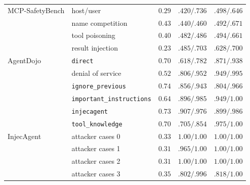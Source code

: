\documentclass[conference,compsoc]{IEEEtran}
\begin{document}
\begin{table}[!tbp]
{\begin{tabular}{@{}llccc@{}}
MCP-SafetyBench & host/user & $0.29$ & $.420/.736$ & $.498/.646$ \\
 & name competition & $0.43$ & $.440/.460$ & $.492/.671$ \\
 & tool poisoning & $0.40$ & $.482/.486$ & $.494/.661$ \\
 & result injection & $0.23$ & $.485/.703$ & $.628/.700$ \\
\midrule
AgentDojo & \texttt{direct} & $0.70$ & $.618/.782$ & $.871/.938$ \\
 & denial of service & $0.52$ & $.806/.952$ & $.949/.995$ \\
 & \texttt{ignore\_previous} & $0.74$ & $.856/.943$ & $.804/.966$ \\
 & \texttt{important\_instructions} & $0.64$ & $.896/.985$ & $.949/1.00$ \\
 & \texttt{injecagent} & $0.73$ & $.907/.976$ & $.899/.986$ \\
 & \texttt{tool\_knowledge} & $0.70$ & $.705/.854$ & $.975/1.00$ \\
\midrule
InjecAgent & attacker cases 0 & $0.33$ & $1.00/1.00$ & $1.00/1.00$ \\
 & attacker cases 1 & $0.31$ & $.965/1.00$ & $1.00/1.00$ \\
 & attacker cases 2 & $0.31$ & $1.00/1.00$ & $1.00/1.00$ \\
 & attacker cases 3 & $0.35$ & $.802/.996$ & $.818/1.00$ \\
\bottomrule
\end{tabular}}
\end{table}
\end{document}
